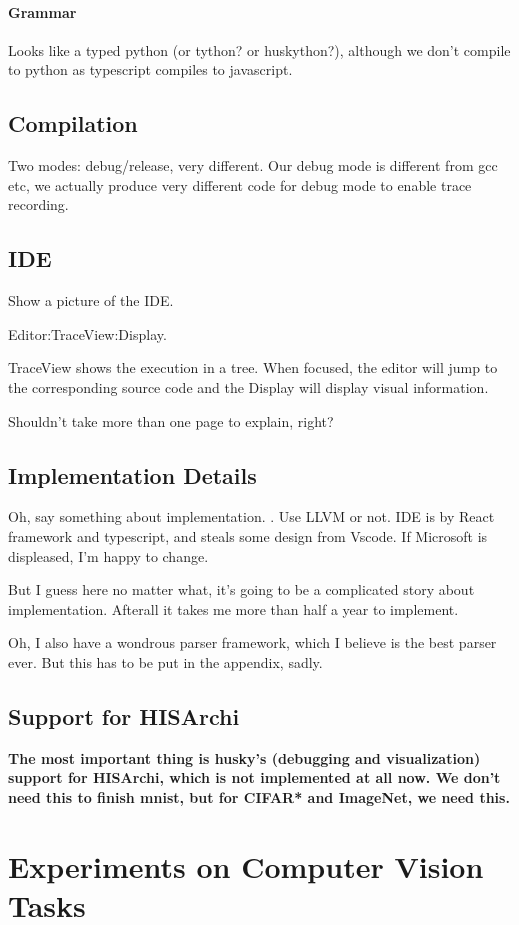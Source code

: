 \documentclass[10pt, oneside]{article}   	%
\theoremstyle{definition}
\begin{document}
\paragraph{Grammar} Looks like a typed python (or tython? or huskython?), although we don't compile to python as typescript compiles to javascript.
\subsection{Compilation}


Two modes: debug/release, very different. Our debug mode is different from gcc etc, we actually produce very different code for debug mode to enable trace recording.
\subsection{IDE}

Show a picture of the IDE.

Editor:TraceView:Display.

TraceView shows the execution in a tree. When focused, the editor will jump to the corresponding source code and the Display will display visual information.

Shouldn't take more than one page to explain, right?

\subsection{Implementation Details}

Oh, say something about implementation. . Use LLVM or not. IDE is by React framework and typescript, and steals some design from Vscode. If Microsoft is displeased, I'm happy to change.

But I guess here no matter what, it's going to be a complicated story about implementation. Afterall it takes me more than half a year to implement.

Oh, I also have a wondrous parser framework, which I believe is the best parser ever. But this has to be put in the appendix, sadly.
\subsection{Support for HISArchi}

\textbf{The most important thing is husky's (debugging and visualization) support for HISArchi, which is not implemented at all now. We don't need this to finish mnist, but for CIFAR* and ImageNet, we need this.}
\section{Experiments on Computer Vision Tasks}
\end{document}
